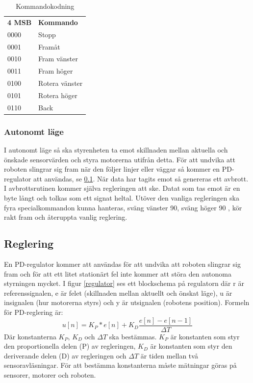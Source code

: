 \begin{table}[h] 
        \label{kodning}
        \begin{tabular}{l l}
                \textbf{4 MSB} & \textbf{Kommando} \\
                0000 & Stopp \\
                0001 & Framåt \\
                0010 & Fram vänster \\
                0011 & Fram höger \\
                0100 & Rotera vänster \\
                0101 & Rotera höger \\
                0110 & Back \\
        \end{tabular}
        \caption{Kommandokodning}
\end{table}

\subsubsection{Autonomt läge}
I autonomt läge så ska styrenheten ta emot skillnaden mellan aktuella och önskade sensorvärden och styra motorerna utifrån detta.
För att undvika att roboten slingrar sig fram när den följer linjer eller väggar så kommer en PD-regulator att användas, se \ref{reglering}.
När data har tagits emot så genereras ett avbrott. I avbrottsrutinen kommer själva regleringen att ske. Datat som tas emot är en byte långt 
och tolkas som ett signat heltal. Utöver den vanliga regleringen ska fyra specialkommandon kunna hanteras, sväng vänster 90\degree, sväng höger 90\degree
, kör rakt fram och återuppta vanlig reglering.

\subsection{Reglering}
\label{reglering}
En PD-regulator kommer att användas för att undvika att roboten slingrar sig fram och för att ett litet stationärt fel inte kommer att störa
den autonoma styrningen mycket. I figur \ref{regulator} ses ett blockschema på regulatorn där r är referenssignalen,
e är felet (skillnaden mellan aktuellt och önskat läge), u är insignalen (hur motorerna styrs) och y är utsignalen (robotens position).
Formeln för PD-reglering är: $$ u[n] = K_P*e[n] + K_D\frac{e[n]-e[n-1]}{\Delta T}$$
Där konstanterna $K_P$, $K_D$ och $\Delta T$ ska bestämmas. $K_P$ är konstanten som styr den proportionella delen (P) av regleringen, 
$K_D$ är konstanten som styr den deriverande delen (D) av regleringen och $\Delta T$ är tiden mellan två sensoravläsningar. 
För att bestämma konstanterna måste mätningar göras på sensorer, motorer och roboten.

